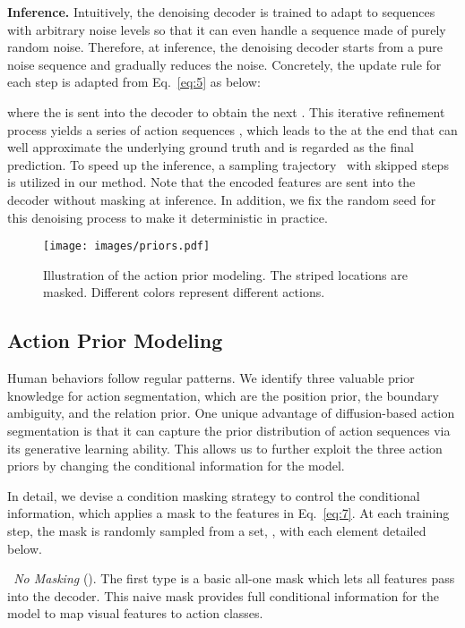 \documentclass[10pt,twocolumn,letterpaper]{article}
\begin{document}
\textbf{Inference.}
Intuitively, the denoising decoder  is trained to adapt to sequences with arbitrary noise levels so that it can even handle a sequence made of purely random noise.
Therefore, at inference, the denoising decoder starts from a pure noise sequence  and gradually reduces the noise.
Concretely, the update rule for each step is adapted from Eq.~\ref{eq:5} as below:

where the  is sent into the decoder to obtain the next .
This iterative refinement process yields a series of action sequences , which leads to the  at the end that can well approximate the underlying ground truth and is regarded as the final prediction.
To speed up the inference, a sampling trajectory~\cite{DDIM} with skipped steps  is utilized in our method.
Note that the encoded features  are sent into the decoder without masking at inference.
In addition, we fix the random seed for this denoising process to make it deterministic in practice.

\begin{figure}[t]
\begin{center}
   \texttt{[image: images/priors.pdf]}
\end{center}
   \caption{Illustration of the action prior modeling. The striped locations are masked. Different colors represent different actions.}
\label{fig:priors}
\end{figure}

\subsection{Action Prior Modeling}

Human behaviors follow regular patterns.
We identify three valuable prior knowledge for action segmentation, which are the position prior, the boundary ambiguity, and the relation prior.
One unique advantage of diffusion-based action segmentation is that it can capture the prior distribution of action sequences via its generative learning ability.
This allows us to further exploit the three action priors by changing the conditional information for the model.

In detail, we devise a condition masking strategy to control the conditional information, which applies a mask  to the features  in Eq.~\ref{eq:7}.
At each training step, the mask is randomly sampled from a set, , with each element detailed below.

\textit{ No Masking} (). 
The first type is a basic all-one mask  which lets all features pass into the decoder. 
This naive mask provides full conditional information for the model to map visual features to action classes.
\end{document}
